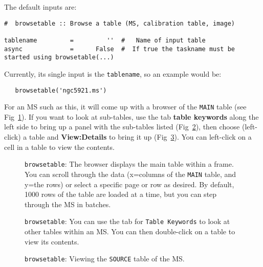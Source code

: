 The default inputs are:
\small
\begin{verbatim}
#  browsetable :: Browse a table (MS, calibration table, image)

tablename         =         ''  #   Name of input table
async             =      False  #  If true the taskname must be started using browsetable(...)

\end{verbatim}
\normalsize

Currently, its single input is the {\tt tablename}, so an example would
be:
\small
\begin{verbatim}
   browsetable('ngc5921.ms')
\end{verbatim}
\normalsize
For an MS such as this, it will come up with a browser of the 
{\tt MAIN} table (see Fig~\ref{fig:qcasabrowser1}).  
If you want to look at sub-tables, use the tab 
{\bf table keywords} along the left side to bring up a panel with the sub-tables
listed (Fig~\ref{fig:qcasabrowser2}), then choose (left-click) a table and
{\bf View:Details} to bring it up (Fig~\ref{fig:qcasabrowser3}).  
You can left-click on a cell in a table to view the
contents.

\begin{figure}[h!]
\begin{center}
\caption{\label{fig:qcasabrowser1} {\tt browsetable}: The browser displays
  the main table within a frame. You can scroll
  through the data (x=columns of the {\tt MAIN} table, and y=the rows) or
  select a specific page or row as desired.  By default, 1000 rows of
  the table are loaded at a time, but you can step through the MS in batches.} 
\hrulefill
\end{center}
\end{figure}

\begin{figure}[h!]
\begin{center}
\caption{\label{fig:qcasabrowser2} {\tt browsetable}: You can use the
  tab for {\tt Table Keywords} to look at other tables within an MS.
  You can then double-click on a table to view its contents.} 
\hrulefill
\end{center}
\end{figure}
 
\begin{figure}[h!]
\begin{center}
\caption{\label{fig:qcasabrowser3} {\tt browsetable}: Viewing the 
{\tt SOURCE} table of the MS.}
\hrulefill
\end{center}
\end{figure}

